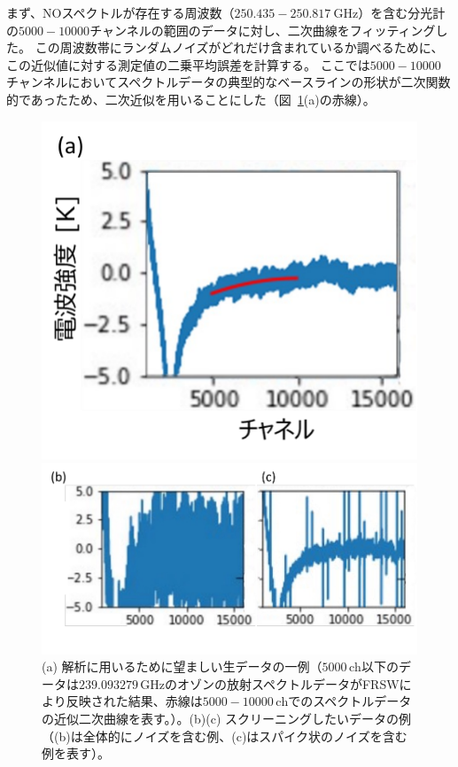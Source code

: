 まず、NOスペクトルが存在する周波数（$250.435-250.817\ \mathrm{GHz}$）を含む分光計の$5000-10000$チャンネルの範囲のデータに対し、二次曲線をフィッティングした。
この周波数帯にランダムノイズがどれだけ含まれているか調べるために、この近似値に対する測定値の二乗平均誤差を計算する。
ここでは$5000-10000$チャンネルにおいてスペクトルデータの典型的なベースラインの形状が二次関数的であったため、二次近似を用いることにした（図~\ref{fig:raw_spectrum}(a)の赤線）。
\begin{figure}[htbp]
    \centering
    \begin{minipage}{0.33\linewidth}
        \centering
        \includegraphics[width=\linewidth]{master_thesis_contents/master_thesis_fig/raw_spectrum_good.pdf}
    \end{minipage}
    \begin{minipage}{0.6\linewidth}
        \centering
        \includegraphics[scale=0.6]{master_thesis_contents/master_thesis_fig/raw_spectrum_bad.pdf}
    \end{minipage}
    \caption{(a) 解析に用いるために望ましい生データの一例（$5000\, \mathrm{ch}$以下のデータは$239.093279\, \mathrm{GHz}$のオゾンの放射スペクトルデータがFRSWにより反映された結果、赤線は$5000-10000\, \mathrm{ch}$でのスペクトルデータの近似二次曲線を表す。）。(b)(c) スクリーニングしたいデータの例（(b)は全体的にノイズを含む例、(c)はスパイク状のノイズを含む例を表す）。}
    \label{fig:raw_spectrum}
\end{figure}
